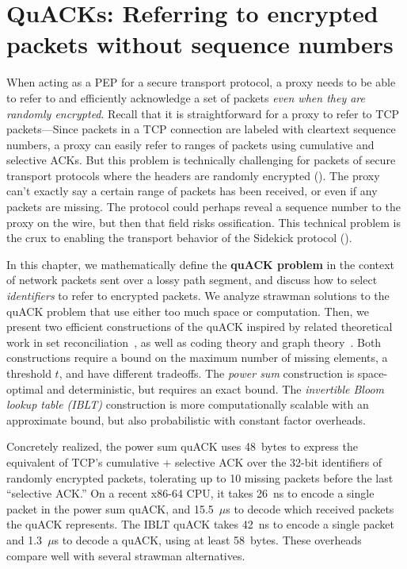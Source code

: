 \chapter[QuACKs]{QuACKs: Referring to encrypted packets without sequence numbers}
\label{sec:quack}



When acting as a PEP for a secure transport protocol, a proxy needs to be
able to refer to and efficiently acknowledge a set of packets \textit{even when
they are randomly encrypted}. Recall that it is straightforward for a proxy to
refer to TCP packets---Since packets in a TCP connection are labeled with
cleartext sequence numbers, a proxy can easily refer to ranges of packets using
cumulative and selective ACKs. But this problem is technically challenging for
packets of secure transport protocols where the headers are randomly encrypted
().
The proxy can't exactly say a certain range of packets has been received, or
even if any packets are missing. The protocol could perhaps reveal a sequence
number to the proxy on the wire, but then that field risks ossification.
This technical problem is the crux to enabling the transport behavior
of the Sidekick protocol ().

In this chapter, we mathematically define the \textbf{quACK problem} in the
context of network packets
sent over a lossy path segment, and discuss how to select \emph{identifiers} to
refer to encrypted packets. We analyze strawman solutions to the quACK problem
that use either too much space or computation. Then, we present two efficient
constructions of the quACK inspired by related theoretical work in set
reconciliation~\cite{minsky2003set,eppstein2011straggler}, as well as coding
theory and graph theory~\cite{karpovsky2003data}. Both constructions require a
bound on the maximum number of missing elements, a threshold $t$, and have
different tradeoffs. The \textit{power sum} construction is space-optimal and
deterministic, but requires an exact bound. The \textit{invertible Bloom lookup
table (IBLT)} construction is more computationally scalable with an approximate
bound, but also probabilistic with constant factor overheads.

Concretely realized, the power sum quACK uses 48~bytes to express the equivalent
of TCP's cumulative + selective ACK over the 32-bit identifiers of randomly
encrypted packets, tolerating up to 10 missing packets before the last
``selective ACK.'' On a recent x86-64 CPU, it takes 26~ns to encode a single
packet in the power sum quACK, and 15.5~$\mu$s to decode which received packets
the quACK represents. The IBLT quACK takes 42~ns to encode a single packet and
1.3~$\mu$s to decode a quACK, using at least 58~bytes. These overheads compare
well with several strawman alternatives.

